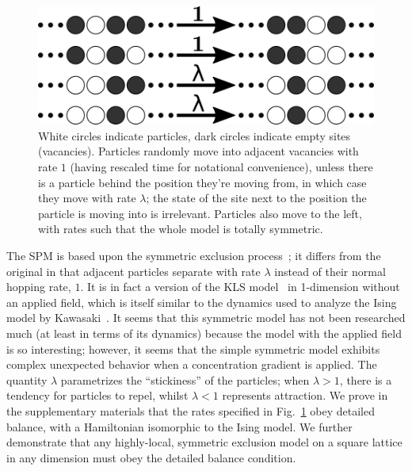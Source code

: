 \documentclass[
reprint,
 amsmath,amssymb,
 aps,
 prl,
]{revtex4-1}
\begin{document}
\begin{figure}
\vspace{1em}
\caption{\label{fig:rates} White circles indicate particles, dark circles indicate empty sites (vacancies). Particles randomly move into adjacent vacancies with rate $1$ (having rescaled time for notational convenience), unless there is a
particle behind the position they're moving from, in which case they move with rate $\lambda$; the state of the site next to the position the particle is moving into is irrelevant.
Particles also move to the left, with rates such that the whole model is totally symmetric.}
    \includegraphics[width=\linewidth]{newRates}
    \vspace{-3em}
\end{figure}
The SPM is based upon the symmetric exclusion process~\cite{sugden2007dynamically, Kollmann2003,  Lin2005, Hegde2014, Krapivsky2014, Imamura2017};
it differs from the original in that adjacent particles separate with rate $\lambda$
instead of their normal hopping rate, $1$. It is in fact a version of the KLS model~\cite{Katz1984, Zia2010} in 1-dimension without an applied field, which is itself similar to the dynamics used to analyze the Ising model by
Kawasaki~\cite{PhysRev.145.224}. It seems that this symmetric model has not been researched much (at least in terms of its dynamics) because the model with the applied field is so interesting; however, it seems that the simple symmetric model
exhibits complex unexpected behavior when a concentration gradient is applied. The quantity $\lambda$ parametrizes the ``stickiness'' of the particles; when $\lambda>1$, there is a tendency for particles to repel,
whilst $\lambda < 1$ represents attraction.
We prove in the supplementary materials that the rates specified in Fig.~\ref{fig:rates} obey detailed balance, with a Hamiltonian isomorphic to the Ising model.
We further demonstrate that any highly-local, symmetric exclusion model on a square lattice in any dimension must obey the detailed balance condition.
\end{document}
